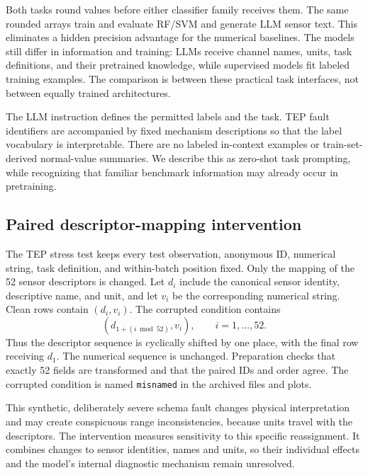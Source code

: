 \documentclass[11pt,a4paper]{article}
\begin{document}
Both tasks round values before either classifier family receives them. The same rounded arrays train and evaluate RF/SVM and generate LLM sensor text. This eliminates a hidden precision advantage for the numerical baselines. The models still differ in information and training: LLMs receive channel names, units, task definitions, and their pretrained knowledge, while supervised models fit labeled training examples. The comparison is between these practical task interfaces, not between equally trained architectures.

The LLM instruction defines the permitted labels and the task. TEP fault identifiers are accompanied by fixed mechanism descriptions so that the label vocabulary is interpretable. There are no labeled in-context examples or train-set-derived normal-value summaries. We describe this as zero-shot task prompting, while recognizing that familiar benchmark information may already occur in pretraining.

\subsection{Paired descriptor-mapping intervention}
The TEP stress test keeps every test observation, anonymous ID, numerical string, task definition, and within-batch position fixed. Only the mapping of the 52 sensor descriptors is changed. Let $d_i$ include the canonical sensor identity, descriptive name, and unit, and let $v_i$ be the corresponding numerical string. Clean rows contain $(d_i,v_i)$. The corrupted condition contains
\begin{equation}
  (d_{1+(i\bmod 52)},v_i),\qquad i=1,\ldots,52.
\end{equation}
Thus the descriptor sequence is cyclically shifted by one place, with the final row receiving $d_1$. The numerical sequence is unchanged. Preparation checks that exactly 52 fields are transformed and that the paired IDs and order agree. The corrupted condition is named \texttt{misnamed} in the archived files and plots.

This synthetic, deliberately severe schema fault changes physical interpretation and may create conspicuous range inconsistencies, because units travel with the descriptors. The intervention measures sensitivity to this specific reassignment. It combines changes to sensor identities, names and units, so their individual effects and the model's internal diagnostic mechanism remain unresolved.
\end{document}
